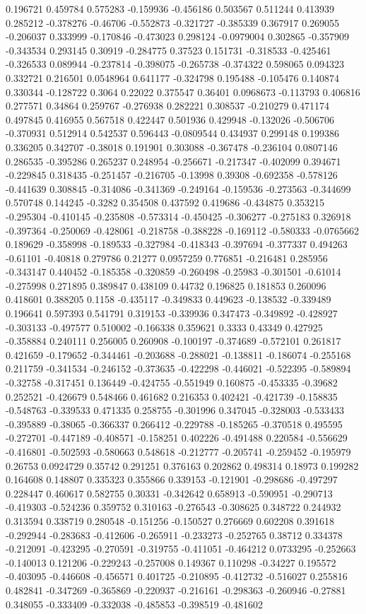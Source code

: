 0.196721 0.459784 0.575283 -0.159936 -0.456186 0.503567 0.511244 0.413939 0.285212 -0.378276 -0.46706 -0.552873 -0.321727 -0.385339 0.367917 0.269055 -0.206037 0.333999 -0.170846 -0.473023 0.298124 -0.0979004 0.302865 -0.357909 -0.343534 0.293145 0.30919 -0.284775 0.37523 0.151731 -0.318533 -0.425461 -0.326533 0.089944 -0.237814 -0.398075 -0.265738 -0.374322 0.598065 0.094323 0.332721 0.216501 0.0548964 0.641177 -0.324798 0.195488 -0.105476 0.140874 0.330344 -0.128722 0.3064 0.22022 0.375547 0.36401 0.0968673 -0.113793 0.406816 0.277571 0.34864 0.259767 -0.276938 0.282221 0.308537 -0.210279 0.471174 0.497845 0.416955 0.567518 0.422447 0.501936 0.429948 -0.132026 -0.506706 -0.370931 0.512914 0.542537 0.596443 -0.0809544 0.434937 0.299148 0.199386 0.336205 0.342707 -0.38018 0.191901 0.303088 -0.367478 -0.236104 0.0807146 0.286535 -0.395286 0.265237 0.248954 -0.256671 -0.217347 -0.402099 0.394671 -0.229845 0.318435 -0.251457 -0.216705 -0.13998 0.39308 -0.692358 -0.578126 -0.441639 0.308845 -0.314086 -0.341369 -0.249164 -0.159536 -0.273563 -0.344699 0.570748 0.144245 -0.3282 0.354508 0.437592 0.419686 -0.434875 0.353215 -0.295304 -0.410145 -0.235808 -0.573314 -0.450425 -0.306277 -0.275183 0.326918 -0.397364 -0.250069 -0.428061 -0.218758 -0.388228 -0.169112 -0.580333 -0.0765662 0.189629 -0.358998 -0.189533 -0.327984 -0.418343 -0.397694 -0.377337 0.494263 -0.61101 -0.40818 0.279786 0.21277 0.0957259 0.776851 -0.216481 0.285956 -0.343147 0.440452 -0.185358 -0.320859 -0.260498 -0.25983 -0.301501 -0.61014 -0.275998 0.271895 0.389847 0.438109 0.44732 0.196825 0.181853 0.260096 0.418601 0.388205 0.1158 -0.435117 -0.349833 0.449623 -0.138532 -0.339489 0.196641 0.597393 0.541791 0.319153 -0.339936 0.347473 -0.349892 -0.428927 -0.303133 -0.497577 0.510002 -0.166338 0.359621 0.3333 0.43349 0.427925 -0.358884 0.240111 0.256005 0.260908 -0.100197 -0.374689 -0.572101 0.261817 0.421659 -0.179652 -0.344461 -0.203688 -0.288021 -0.138811 -0.186074 -0.255168 0.211759 -0.341534 -0.246152 -0.373635 -0.422298 -0.446021 -0.522395 -0.589894 -0.32758 -0.317451 0.136449 -0.424755 -0.551949 0.160875 -0.453335 -0.39682 0.252521 -0.426679 0.548466 0.461682 0.216353 0.402421 -0.421739 -0.158835 -0.548763 -0.339533 0.471335 0.258755 -0.301996 0.347045 -0.328003 -0.533433 -0.395889 -0.38065 -0.366337 0.266412 -0.229788 -0.185265 -0.370518 0.495595 -0.272701 -0.447189 -0.408571 -0.158251 0.402226 -0.491488 0.220584 -0.556629 -0.416801 -0.502593 -0.580663 0.548618 -0.212777 -0.205741 -0.259452 -0.195979 0.26753 0.0924729 0.35742 0.291251 0.376163 0.202862 0.498314 0.18973 0.199282 0.164608 0.148807 0.335323 0.355866 0.339153 -0.121901 -0.298686 -0.497297 0.228447 0.460617 0.582755 0.30331 -0.342642 0.658913 -0.590951 -0.290713 -0.419303 -0.524236 0.359752 0.310163 -0.276543 -0.308625 0.348722 0.244932 0.313594 0.338719 0.280548 -0.151256 -0.150527 0.276669 0.602208 0.391618 -0.292944 -0.283683 -0.412606 -0.265911 -0.233273 -0.252765 0.38712 0.334378 -0.212091 -0.423295 -0.270591 -0.319755 -0.411051 -0.464212 0.0733295 -0.252663 -0.140013 0.121206 -0.229243 -0.257008 0.149367 0.110298 -0.34227 0.195572 -0.403095 -0.446608 -0.456571 0.401725 -0.210895 -0.412732 -0.516027 0.255816 0.482841 -0.347269 -0.365869 -0.220937 -0.216161 -0.298363 -0.260946 -0.27881 0.348055 -0.333409 -0.332038 -0.485853 -0.398519 -0.481602 
